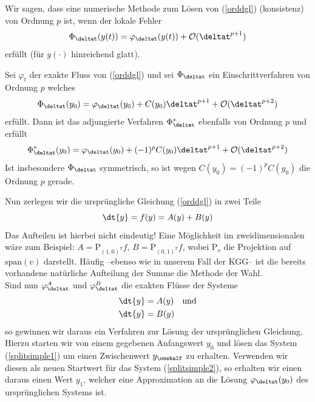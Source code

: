 \begin{mathdef}[Konsistenzordnung]
Wir sagen, dass eine numerische Methode zum Lösen von (\ref{orddgl}) (konsistenz) von Ordnung $p$ ist, wenn der lokale Fehler \[\Phi_{\deltat}(y(t))=\varphi_{\deltat}(y(t))+\mathcal{O}(\deltat^{p+1})\] erfüllt (für $y(\cdot)$ hinreichend glatt).
\end{mathdef}
\begin{maththeorem}
\label{adjfloworder}
Sei $\varphi_t$ der exakte Fluss von (\ref{orddgl}) und sei $\Phi_{\deltat}$ ein Einschrittverfahren von Ordnung $p$ welches 
\[\Phi_{\deltat}(y_0)=\varphi_{\deltat}(y_0)+C(y_0)\deltat^{p+1}+\mathcal{O}(\deltat^{p+2})\]
erfüllt. Dann ist das adjungierte Verfahren $\Phi_{\deltat}^*$ ebenfalls von Ordnung $p$ und erfüllt
\[\Phi_{\deltat}^*(y_0)=\varphi_{\deltat}(y_0)+(-1)^{p}C(y_0)\deltat^{p+1}+\mathcal{O}(\deltat^{p+2})\]
Ist insbesondere $\Phi_{\deltat}$ symmetrisch, so ist wegen $C(y_0)=(-1)^pC(y_0)$ die Ordnung $p$ gerade.
\end{maththeorem}
Nun zerlegen wir die ursprüngliche Gleichung (\ref{orddgl}) in zwei Teile
\[\dt{y}=f(y)=A(y)+B(y) \]
Das Aufteilen ist hierbei nicht eindeutig! Eine Möglichkeit im zweidimensionalen wäre zum Beispiel: $A=\text{P}_{(1,0)^T}f,\,B=\text{P}_{(0,1)^T}f$, wobei $\text{P}_v$ die Projektion auf $\text{span}(v)$ darstellt. Häufig --ebenso wie in unserem Fall der KGG-- ist die bereits vorhandene natürliche Aufteilung der Summe die Methode der Wahl.\\
Sind nun $\varphi_{\deltat}^A$ und $\varphi_{\deltat}^B$ die exakten Flüsse der Systeme
\begin{align}
\dt{y}&=A(y)\quad \text{und} \label{splitsimple1}\\ 
\dt{y}&=B(y) \label{splitsimple2}
\end{align}
so gewinnen wir daraus ein Verfahren zur Lösung der ursprünglichen Gleichung.\\
Hierzu starten wir von einem gegebenen Anfangswert $y_0$ und lösen das System (\ref{splitsimple1}) um einen Zwischenwert $y_{\onehalf}$ zu erhalten. Verwenden wir diesen als neuen Startwert für das System (\ref{splitsimple2}), so erhalten wir einen daraus einen Wert $y_1$, welcher eine Approximation an die Lösung $\varphi_{\deltat}(y_0)$ des ursprünglichen Systems ist.\\[1cm]
\noindent\begin{minipage}{0.3\textwidth}


\end{minipage}%
